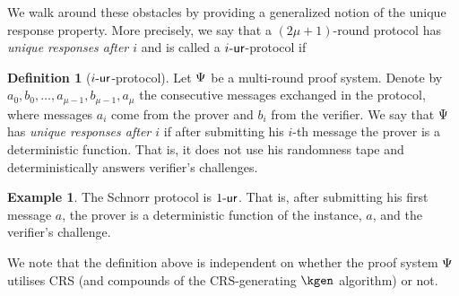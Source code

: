 \documentclass[runningheads,11pt]{llncs}
\theoremstyle{definition}
\newtheorem{definition}[theorem]{Definition}
\newtheorem{example}[theorem]{Example}
\begin{document}
We walk around these obstacles by providing a generalized notion of the unique response property.
More precisely, we say that a $(2\mu + 1)$-round protocol has \emph{unique responses after $i$} and is called a ${i\text{-}\mathsf{ur}}$-protocol if
\begin{definition}[${i\text{-}\mathsf{ur}}$-protocol]
	\label{def:wiur}
	Let $\mathrm{\Psi}$ be a multi-round proof system.
	Denote by $a_0, b_0, \ldots, a_{\mu - 1}, b_{\mu - 1}, a_{\mu}$ the consecutive messages exchanged in the protocol, where messages $a_i$ come from the prover and $b_i$ from the verifier.
	We say that $\mathrm{\Psi}$ has \emph{unique responses after $i$}
	if after submitting his $i$-th message the prover is a deterministic function. That is, it does not use his randomness tape and deterministically answers verifier's challenges.
\end{definition}
\begin{example}
	The Schnorr protocol is ${1\text{-}\mathsf{ur}}$. That is, after submitting his first message $a$, the prover is a deterministic function of the instance, $a$, and the verifier's challenge.
\end{example}

We note that the definition above is independent on whether the proof system $\mathrm{\Psi}$ utilises CRS (and compounds of the CRS-generating $\kgen$ algorithm) or not.

% 
% 
\end{document}
